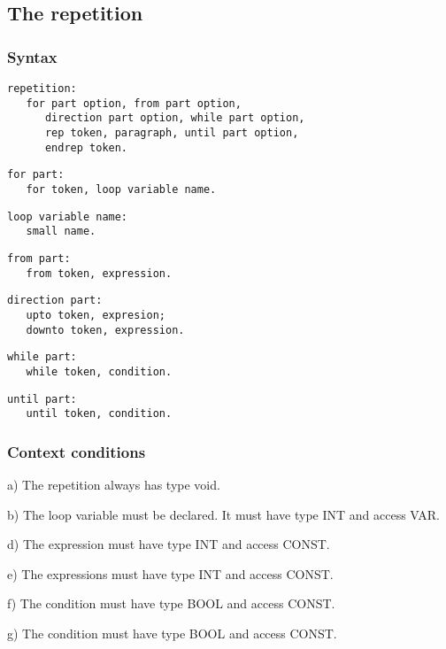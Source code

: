 \documentclass [a4paper,12pt,fleqn]{article}
\begin{document}
\subsection {The repetition}
\subsubsection*{Syntax}
\begin{letterlist}
\item
\begin{verbatim}
repetition:
   for part option, from part option,
      direction part option, while part option,
      rep token, paragraph, until part option,
      endrep token.
\end{verbatim}
\item
\begin{verbatim}
for part:
   for token, loop variable name.
\end{verbatim}
\item
\begin{verbatim}
loop variable name:
   small name.
\end{verbatim}
\item
\begin{verbatim}
from part:
   from token, expression.
\end{verbatim}
\item
\begin{verbatim}
direction part:
   upto token, expresion;
   downto token, expression.
\end{verbatim}
\item
\begin{verbatim}
while part:
   while token, condition.
\end{verbatim}
\item
\begin{verbatim}
until part:
   until token, condition.
\end{verbatim}
\end{letterlist}
\subsubsection*{Context conditions}
\begin{list}{-}{}
\item[a)]
The repetition always has type void.
\item[b)]
The loop variable must be declared.
It must have type INT and access VAR.
\item[d)]
The expression must have type INT and access CONST.
\item[e)]
The expressions must have type INT and access CONST.
\item[f)]
The condition must have type BOOL and access CONST.
\item[g)]
The condition must have type BOOL and access CONST.
\end{list}
\end{document}

